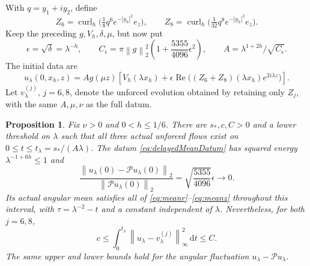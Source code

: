 \documentclass[11pt]{article}
\newtheorem{proposition}[theorem]{Proposition}
\theoremstyle{remark}
\newcommand{\PP}{\mathcal P}
\newcommand{\dd}{\,\mathrm d}
\newcommand{\norm}[1]{\left\lVert#1\right\rVert}
\newcommand{\curl}{\operatorname{curl}}
\begin{document}
With $q=y_1+i y_2$, define
\[
 Z_6=\curl_h\big(\tfrac18q^6e^{-|y_h|^2}e_z\big),\qquad
 Z_8=\curl_h\big(\tfrac1{32}q^8e^{-|y_h|^2}e_z\big).
\]
Keep the preceding $g,V_h,\delta,\mu$, but now put
\[
 \epsilon=\sqrt\delta=\lambda^{-h},\qquad
 C_\epsilon=\pi\norm g_2^2
                \left(1+\frac{5355}{4096}\epsilon^2\right),
 \qquad A=\lambda^{1+2h}/\sqrt{C_\epsilon}.
\]
The initial data are
\begin{equation}\label{eq:delayedMeanDatum}
 u_\lambda(0,x_h,z)=A g(\mu z)
   \left[V_h(\lambda x_h)+\epsilon\operatorname{Re}
           \big((Z_6+Z_8)(\lambda x_h)e^{2i\lambda z}\big)\right].
\end{equation}
Let $v_\lambda^{(j)}$, $j=6,8$, denote the unforced evolution obtained
by retaining only $Z_j$, with the same $A,\mu,\nu$ as the full datum.

\begin{proposition}\label{prop:delayedMean}
Fix $\nu>0$ and $0<h\leq1/6$. There are $s_*,c,C>0$ and a lower
threshold on $\lambda$ such that all three actual unforced flows exist
on $0\leq t\leq t_\lambda=s_*/(A\lambda)$. The datum
\eqref{eq:delayedMeanDatum} has squared energy $\lambda^{-1+6h}\leq1$
and
\[
 \frac{\norm{u_\lambda(0)-\PP u_\lambda(0)}_2}
      {\norm{\PP u_\lambda(0)}_2}
                =\sqrt{\frac{5355}{4096}}\epsilon\longrightarrow0.
\]
Its actual angular mean satisfies all of
\eqref{eq:meanr}--\eqref{eq:meanz} throughout this interval, with
$\tau=\lambda^{-2}-t$ and a constant independent of $\lambda$.
Nevertheless, for both $j=6,8$,
\begin{equation}\label{eq:delayedMeanHistory}
 c\leq\int_0^{t_\lambda}
          \norm{u_\lambda-v_\lambda^{(j)}}_\infty^2\dd t\leq C.
\end{equation}
The same upper and lower bounds hold for the angular fluctuation
$u_\lambda-\PP u_\lambda$.
\end{proposition}
\end{document}
